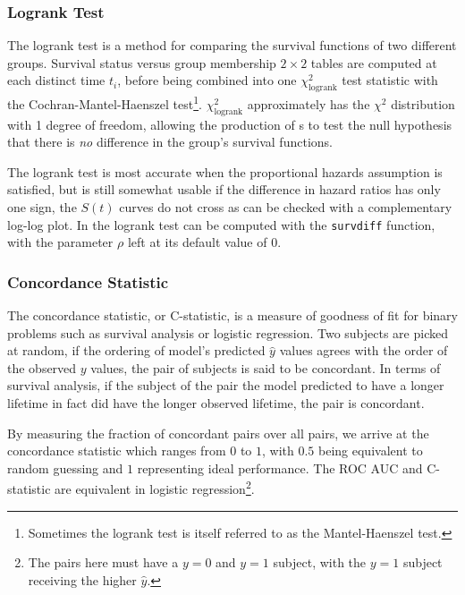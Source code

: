 \subsubsection{Logrank Test}
\label{additional:Survival:additional:logrank}

The logrank test is a method for comparing the survival functions of two different groups.
Survival status versus group membership $2\times2$ tables are computed at each distinct time $t_{i}$,
before being combined into one $\chi_{\text{logrank}}^{2}$ test statistic
with the Cochran-Mantel-Haenszel test\footnote{Sometimes
the logrank test is itself referred to as the Mantel-Haenszel test.}.
$\chi_{\text{logrank}}^{2}$ approximately has the $\chi^{2}$ distribution with 1 degree of freedom,
allowing the production of {\pvalue}s to test the null hypothesis
that there is {\em no} difference in the group's survival functions.

The logrank test is most accurate when the proportional hazards assumption is satisfied,
but is still somewhat usable if the difference in hazard ratios has only one sign,
\ie the $S\left(t\right)$ curves do not cross as can be checked with a complementary log-log plot.
In \R the logrank test can be computed with the \texttt{survdiff} function,
with the parameter $\rho$ left at its default value of $0$.

\subsubsection{Concordance Statistic}
\label{additional:Survival:additional:concordance}
The concordance statistic, or C-statistic, is a measure of goodness of fit
for binary problems such as survival analysis or logistic regression.
Two subjects are picked at random, if the ordering of model's predicted $\hat{y}$ values
agrees with the order of the observed $y$ values, the pair of subjects is said to be concordant.
In terms of survival analysis, if the subject of the pair the model predicted to have a longer lifetime
in fact did have the longer observed lifetime, the pair is concordant.

By measuring the fraction of concordant pairs over all pairs,
we arrive at the concordance statistic which ranges from $0$ to $1$,
with $0.5$ being equivalent to random guessing and $1$ representing ideal performance.
The ROC AUC and C-statistic are equivalent in
logistic regression\footnote{The pairs here must have a $y=0$ and $y=1$ subject, with the $y=1$ subject receiving the higher $\hat{y}$.}.

